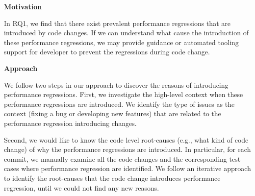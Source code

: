 
\noindent \textbf{Motivation}

In RQ1, we find that there exist prevalent performance regressions that are introduced by code changes. If we can understand what cause the introduction of these performance regressions, we may provide guidance or automated tooling support for developer to prevent the regressions during code change. 

\noindent \textbf{Approach}

We follow two steps in our approach to discover the reasons of introducing performance regressions. First, we investigate the high-level context when these performance regressions are introduced. We identify the type of issues as the context (fixing a bug or developing new features) that are related to the performance regression introducing changes. 

Second, we would like to know the code level root-causes (e.g., what kind of code change) of why the performance regressions are introduced. In particular, for each commit, we manually examine all the code changes and the corresponding test cases where performance regression are identified. We follow an iterative approach to identify the root-causes that the code change introduces performance regression, until we could not find any new reasons. 

